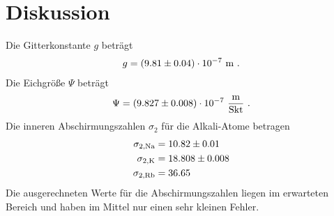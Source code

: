 \section{Diskussion}
\label{sec:Diskussion}
Die Gitterkonstante $g$ beträgt
\begin{align*}
  g = (\num{9.81 +- 0.04}) \cdot 10^{-7}\ \text{m} \ .
\end{align*}
Die Eichgröße $\Psi$ beträgt
\begin{align*}
  \Psi = (\num{9.827 +- 0.008}) \cdot 10^{-7}\ \frac{\text{m}}{\text{Skt}} \ .
\end{align*}
Die inneren Abschirmungszahlen $\sigma_2$ für die Alkali-Atome betragen
\begin{align*}
  \sigma_{2,\text{Na}} & = \num{10.82 +- 0.01} \\
  \sigma_{2,\text{K}}  & = \num{18.808 +- 0.008} \\
  \sigma_{2,\text{Rb}} & = 36.65
\end{align*}
Die ausgerechneten Werte für die Abschirmungszahlen liegen im erwarteten Bereich und haben im Mittel nur einen sehr kleinen Fehler. 
